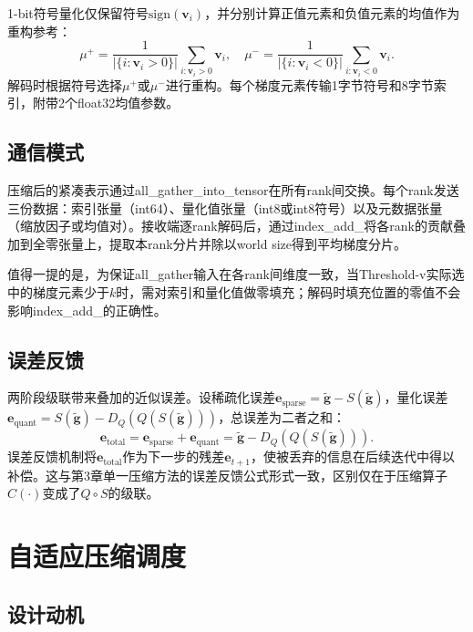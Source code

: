 1-bit符号量化仅保留符号\(\text{sign}(\mathbf{v}_i)\)，并分别计算正值元素和负值元素的均值作为重构参考：
\begin{equation}
\mu^+ = \frac{1}{|\{i : \mathbf{v}_i > 0\}|} \sum_{i: \mathbf{v}_i > 0} \mathbf{v}_i, \quad
\mu^- = \frac{1}{|\{i : \mathbf{v}_i < 0\}|} \sum_{i: \mathbf{v}_i < 0} \mathbf{v}_i.
\label{eq:hybrid-1bit-mu}
\end{equation}
解码时根据符号选择\(\mu^+\)或\(\mu^-\)进行重构。每个梯度元素传输1字节符号和8字节索引，附带2个float32均值参数。

\subsection{通信模式}

压缩后的紧凑表示通过all\_gather\_into\_tensor在所有rank间交换。每个rank发送三份数据：索引张量（int64）、量化值张量（int8或int8符号）以及元数据张量（缩放因子或均值对）。接收端逐rank解码后，通过index\_add\_将各rank的贡献叠加到全零张量上，提取本rank分片并除以world size得到平均梯度分片。

值得一提的是，为保证all\_gather输入在各rank间维度一致，当Threshold-v实际选中的梯度元素少于\(k\)时，需对索引和量化值做零填充；解码时填充位置的零值不会影响index\_add\_的正确性。

\subsection{误差反馈}

两阶段级联带来叠加的近似误差。设稀疏化误差\(\mathbf{e}_{\text{sparse}} = \tilde{\mathbf{g}} - S(\tilde{\mathbf{g}})\)，量化误差\(\mathbf{e}_{\text{quant}} = S(\tilde{\mathbf{g}}) - D_Q(Q(S(\tilde{\mathbf{g}})))\)，总误差为二者之和：
\begin{equation}
\mathbf{e}_{\text{total}} = \mathbf{e}_{\text{sparse}} + \mathbf{e}_{\text{quant}} = \tilde{\mathbf{g}} - D_Q(Q(S(\tilde{\mathbf{g}}))).
\label{eq:hybrid-error}
\end{equation}
误差反馈机制将\(\mathbf{e}_{\text{total}}\)作为下一步的残差\(\mathbf{e}_{t+1}\)，使被丢弃的信息在后续迭代中得以补偿。这与第3章单一压缩方法的误差反馈公式形式一致，区别仅在于压缩算子\(C(\cdot)\)变成了\(Q \circ S\)的级联。

\section{自适应压缩调度}

\subsection{设计动机}

